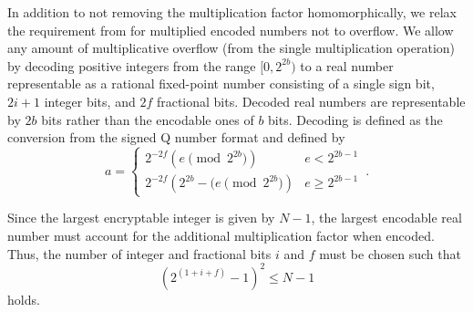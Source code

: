 \documentclass[letterpaper, 10 pt, conference]{ieeeconf}  %
\begin{document}
In addition to not removing the multiplication factor homomorphically, we relax the requirement from \cite{farokhiSecurePrivateControl2017} for multiplied encoded numbers not to overflow. We allow any amount of multiplicative overflow (from the single multiplication operation) by decoding positive integers from the range $[0,2^{2b})$ to a real number representable as a rational fixed-point number consisting of a single sign bit, $2i+1$ integer bits, and $2f$ fractional bits. Decoded real numbers are representable by $2b$ bits rather than the encodable ones of $b$ bits. Decoding is defined as the conversion from the signed Q number format \cite{oberstarFixedPointRepresentationFractional2007} and defined by
\begin{equation}
   a=
   \begin{cases}
      2^{-2f}\left(e \pmod{2^{2b}}\right) & e<2^{2b-1} \\
      2^{-2f}\left( 2^{2b} - (e \pmod{2^{2b}}\right) & e\geq 2^{2b-1}
   \end{cases}\,. \label{eqn:qmn_mult_decode}
\end{equation}

Since the largest encryptable integer is given by $N-1$, the largest encodable real number must account for the additional multiplication factor when encoded. Thus, the number of integer and fractional bits $i$ and $f$ must be chosen such that
\begin{equation}
   (2^{(1+i+f)}-1)^2 \leq N-1 \label{eqn:qmn_max}
\end{equation}
holds.

\end{document}
